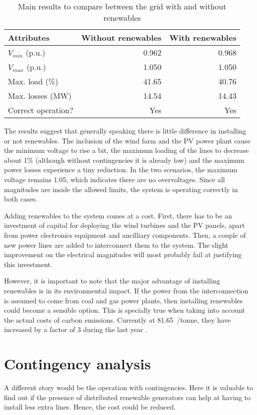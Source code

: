 \begin{table}[!htb]\centering
  \begin{tabular}{lrr}
    \hline
    \textbf{Attributes} & \textbf{Without renewables} & \textbf{With renewables}\\
    \hline
    $V_{min}$ (p.u.) & 0.962 & 0.968 \\
    $V_{max}$ (p.u.) & 1.050 & 1.050 \\
    Max. load (\%) & 41.65 & 40.76 \\
    Max. losses (MW) & 14.54 & 14.43 \\
    Correct operation? & Yes & Yes \\
    \hline
  \end{tabular}
  \caption{Main results to compare between the grid with and without renewables}
  \label{tab:compare}
\end{table}
The results suggest that generally speaking there is little difference in installing or not renewables. The inclusion of the wind farm and the PV power plant cause the minimum voltage to rise a bit, the maximum loading of the lines to decrease about 1\% (although without contingencies it is already low) and the maximum power losses experience a tiny reduction. In the two scenarios, the maximum voltage remains 1.05, which indicates there are no overvoltages. Since all magnitudes are inside the allowed limits, the system is operating correctly in both cases.

Adding renewables to the system comes at a cost. First, there has to be an investment of capital for deploying the wind turbines and the PV panels, apart from power electronics equipment and ancilliary components. Then, a couple of new power lines are added to interconnect them to the system. The slight improvement on the electrical magnitudes will most probably fail at justifying this investment. 

However, it is important to note that the major advantage of installing renewables is in its environmental impact. If the power from the interconnection is assumed to come from coal and gas power plants, then installing renewables could become a sensible option. This is specially true when taking into account the actual costs of carbon emissions. Currently at 81.65~\texteuro/tonne, they have increased by a factor of 3 during the last year \cite{carbon}. 




\section{Contingency analysis}
A different story would be the operation with contingencies. Here it is valuable to find out if the presence of distributed renewable generators can help at having to install less extra lines. Hence, the cost could be reduced. 

